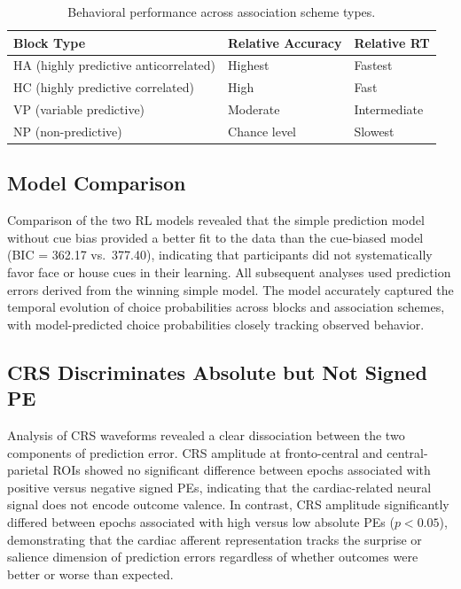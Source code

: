\documentclass[12pt]{article}
\begin{document}
\begin{table}[ht]
\centering
\caption{Behavioral performance across association scheme types.}
\label{tab:behavior}
\begin{tabular}{lll}
\toprule
Block Type & Relative Accuracy & Relative RT \\
\midrule
HA (highly predictive anticorrelated) & Highest & Fastest \\
HC (highly predictive correlated) & High & Fast \\
VP (variable predictive) & Moderate & Intermediate \\
NP (non-predictive) & Chance level & Slowest \\
\bottomrule
\end{tabular}
\end{table}

\subsection{Model Comparison}

Comparison of the two RL models revealed that the simple prediction model without cue bias provided a better fit to the data than the cue-biased model (BIC = 362.17 vs.\ 377.40), indicating that participants did not systematically favor face or house cues in their learning. All subsequent analyses used prediction errors derived from the winning simple model. The model accurately captured the temporal evolution of choice probabilities across blocks and association schemes, with model-predicted choice probabilities closely tracking observed behavior.

\subsection{CRS Discriminates Absolute but Not Signed PE}

Analysis of CRS waveforms revealed a clear dissociation between the two components of prediction error. CRS amplitude at fronto-central and central-parietal ROIs showed no significant difference between epochs associated with positive versus negative signed PEs, indicating that the cardiac-related neural signal does not encode outcome valence. In contrast, CRS amplitude significantly differed between epochs associated with high versus low absolute PEs ($p < 0.05$), demonstrating that the cardiac afferent representation tracks the surprise or salience dimension of prediction errors regardless of whether outcomes were better or worse than expected.
\end{document}
